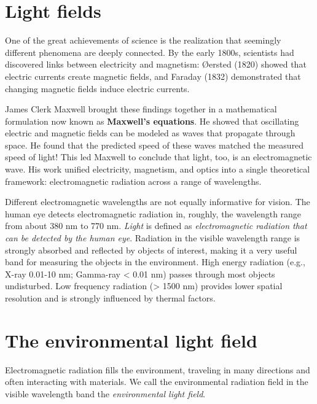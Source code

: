 \documentclass[
  letterpaper,
]{book}
\begin{document}
\section{Light fields}\label{sec-lightfields}

One of the great achievements of science is the realization that
seemingly different phenomena are deeply connected. By the early 1800s,
scientists had discovered links between electricity and magnetism:
Øersted (1820) showed that electric currents create magnetic fields, and
Faraday (1832) demonstrated that changing magnetic fields induce
electric currents.

James Clerk Maxwell brought these findings together in a mathematical
formulation now known as \textbf{Maxwell's equations}. He showed that
oscillating electric and magnetic fields can be modeled as waves that
propagate through space. He found that the predicted speed of these
waves matched the measured speed of light! This led Maxwell to conclude
that light, too, is an electromagnetic wave. His work unified
electricity, magnetism, and optics into a single theoretical framework:
electromagnetic radiation across a range of wavelengths.

Different electromagnetic wavelengths are not equally informative for
vision. The human eye detects electromagnetic radiation in, roughly, the
wavelength range from about 380 nm to 770 nm. \emph{Light} is defined as
\emph{electromagnetic radiation that can be detected by the human eye}.
Radiation in the visible wavelength range is strongly absorbed and
reflected by objects of interest, making it a very useful band for
measuring the objects in the environment. High energy radiation (e.g.,
X-ray 0.01-10 nm; Gamma-ray \textless{} 0.01 nm) passes through most
objects undisturbed. Low frequency radiation (\textgreater{} 1500 nm)
provides lower spatial resolution and is strongly influenced by thermal
factors.

\section{The environmental light field}\label{sec-lightfields-types}

Electromagnetic radiation fills the environment, traveling in many
directions and often interacting with materials. We call the
environmental radiation field in the visible wavelength band the
\emph{environmental light field}.
\end{document}
